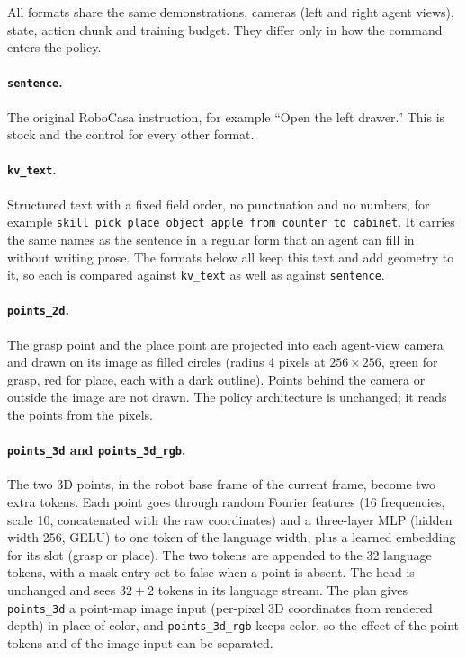 All formats share the same demonstrations, cameras (left and right agent
views), state, action chunk and training budget. They differ only in how the
command enters the policy.

\paragraph{\texttt{sentence}.} The original RoboCasa instruction, for example
``Open the left drawer.'' This is stock \dem{} and the control for every
other format.

\paragraph{\texttt{kv\_text}.} Structured text with a fixed field order, no
punctuation and no numbers, for example
\texttt{skill pick place object apple from counter to cabinet}. It carries the
same names as the sentence in a regular form that an agent can fill in
without writing prose. The formats below all keep this text and add geometry
to it, so each is compared against \texttt{kv\_text} as well as against
\texttt{sentence}.

\paragraph{\texttt{points\_2d}.} The grasp point and the place point are
projected into each agent-view camera and drawn on its image as filled
circles (radius 4 pixels at $256\times256$, green for grasp, red for place,
each with a dark outline). Points behind the camera or outside the image are
not drawn. The policy architecture is unchanged; it reads the points from the
pixels.

\paragraph{\texttt{points\_3d} and \texttt{points\_3d\_rgb}.} The two 3D
points, in the robot base frame of the current frame, become two extra tokens.
Each point goes through random Fourier features (16 frequencies, scale 10,
concatenated with the raw coordinates) and a three-layer MLP (hidden width
256, GELU) to one token of the language width, plus a learned embedding for
its slot (grasp or place). The two tokens are appended to the 32 language
tokens, with a mask entry set to false when a point is absent. The \dem{}
head is unchanged and sees $32+2$ tokens in its language stream. The plan
gives \texttt{points\_3d} a point-map image input (per-pixel 3D coordinates
from rendered depth) in place of color, and \texttt{points\_3d\_rgb} keeps
color, so the effect of the point tokens and of the image input can be
separated. 

